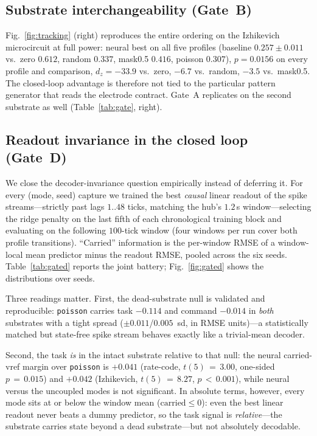 \subsection{Substrate interchangeability (Gate~B)}

Fig.~\ref{fig:tracking} (right) reproduces the entire ordering on the
Izhikevich microcircuit at full power: neural best on all five profiles
(baseline $0.257\pm0.011$ vs.\ zero $0.612$, random $0.337$, mask0.5 $0.416$,
poisson $0.307$), $p=0.0156$ on every profile and comparison, $d_z=-33.9$ vs.\
zero, $-6.7$ vs.\ random, $-3.5$ vs.\ mask0.5. The closed-loop advantage is
therefore not tied to the particular pattern generator that reads the electrode
contract. Gate~A replicates on the second substrate as well
(Table~\ref{tab:gate}, right).

\subsection{Readout invariance in the closed loop (Gate~D)}
\label{sec:resG}

We close the decoder-invariance question empirically instead of deferring it.
For every (mode, seed) capture we trained the best \emph{causal} linear readout
of the spike streams---strictly past lags $1..48$ ticks, matching the hub's
$1.2\,$s window---selecting the ridge penalty on the last fifth of each
chronological training block and evaluating on the following $100$-tick window
(four windows per run cover both profile transitions). ``Carried'' information
is the per-window RMSE of a window-local mean predictor minus the readout RMSE,
pooled across the six seeds. Table~\ref{tab:gated} reports the joint battery;
Fig.~\ref{fig:gated} shows the distributions over seeds.

Three readings matter. First, the dead-substrate null is validated and
reproducible: \texttt{poisson} carries task $-0.114$ and command $-0.014$ in
\emph{both} substrates with a tight spread ($\pm 0.011$/$0.005$~sd, in RMSE
units)---a statistically matched but state-free spike stream behaves exactly
like a trivial-mean decoder.

Second, the task \emph{is} in the intact substrate relative to that null: the
neural carried-vref margin over \texttt{poisson} is $+0.041$ (rate-code,
$t(5)\,{=}\,3.00$, one-sided $p\,{=}\,0.015$) and $+0.042$ (Izhikevich,
$t(5)\,{=}\,8.27$, $p\,{<}\,0.001$), while neural versus the uncoupled modes is
not significant. In absolute terms, however, every mode sits at or below the
window mean ($\mathrm{carried}\le 0$): even the best linear readout never
beats a dummy predictor, so the task signal is \emph{relative}---the substrate
carries state beyond a dead substrate---but not absolutely decodable.

